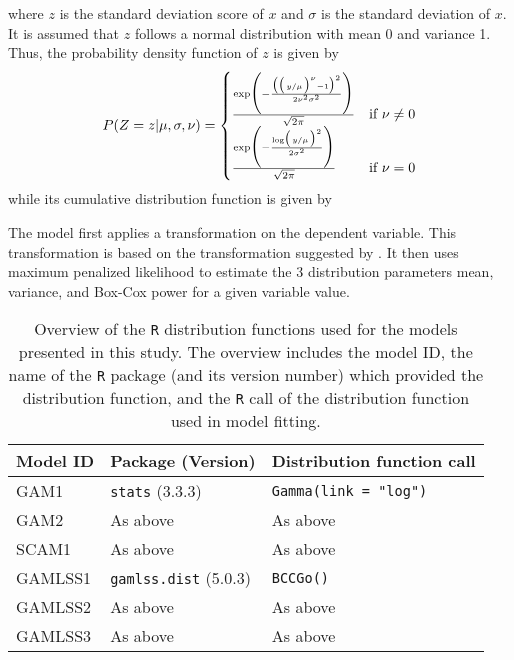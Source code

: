 where \(z\) is the standard deviation score of \(x\) and \(\sigma\) is the standard deviation of \(x\).  It is assumed that \(z\) follows a normal distribution with mean 0 and variance 1. Thus, the probability density function of \(z\) is given by
\begin{equation}
  \label{eq:StandardNormalDistributionPDF}
  P(Z = z|\mu, \sigma, \nu) =
  \begin{cases}
    \frac{\exp\Biggl(-\frac{\bigl(\bigl(\left.y \middle/ \mu\right.\bigr)^\nu - 1\bigr)^2}{2 \nu^2 \sigma^2}\Biggr)}{\sqrt{2 \pi}} &\text{if } \nu \not = 0 \\
    \frac{\exp\Biggl(-\frac{\log\bigl(\left.y \middle/ \mu\right.\bigr)^2}{2 \sigma^2}\Biggr)}{\sqrt{2 \pi}} &\text{if } \nu = 0
\end{cases}
\end{equation}
while its cumulative distribution function is given by
\parencite{Henze2013,Weisstein2017c}

The model first applies a transformation on the dependent variable.  This transformation is based on the transformation suggested by \textcite{Box1964}.  It then uses maximum penalized likelihood to estimate the 3 distribution parameters mean, variance, and Box-Cox power for a given variable value.

\begin{table}[H]
  {\tabulinesep=2mm
    \begin{longtabu}{l l L}
      \caption{Overview of the \texttt{R} distribution functions used for the models presented in this study.  The overview includes
        the model ID,
        the name of the \texttt{R} package (and its version number) which provided the distribution function,
        and the \texttt{R} call of the distribution function used in model fitting.
        \label{tab:PresentedModelsOverviewDistributions}} \\
      \toprule
      Model ID & Package (Version) & Distribution function call \\
      \midrule
      \endhead
      \bottomrule
      \endlastfoot
      GAM1 & \texttt{stats} (3.3.3) & \texttt{Gamma(link = "log")} \\
      GAM2 & As above & As above \\
      SCAM1 & As above & As above \\
      GAMLSS1 & \texttt{gamlss.dist} (5.0.3) & \texttt{BCCGo()} \\
      GAMLSS2 & As above & As above \\
      GAMLSS3 & As above & As above \\
      \bottomrule
    \end{longtabu}}
\end{table}

